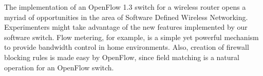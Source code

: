 The implementation of an OpenFlow 1.3 switch for a wireless router opens a myriad of opportunities in the area of Software Defined Wireless Networking. Experimenters might take advantage of the new features implemented by our software switch. Flow metering, for example, is a simple yet powerful mechanism to provide bandwidth control in home environments. Also, creation of firewall blocking rules is made easy by OpenFlow, since field matching is a natural  operation for an OpenFlow switch.
